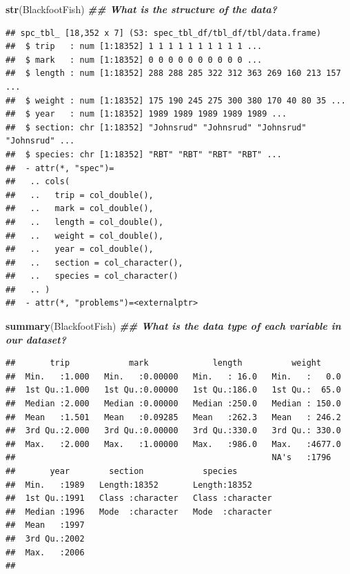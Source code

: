 \documentclass[
  10pt,
  letterpaper,
  twoside,
  openright]{book}
\newenvironment{Shaded}{\begin{snugshade}}{\end{snugshade}}
\newcommand{\DocumentationTok}[1]{\textcolor[rgb]{0.56,0.35,0.01}{\textbf{\textit{#1}}}}
\newcommand{\FunctionTok}[1]{\textcolor[rgb]{0.13,0.29,0.53}{\textbf{#1}}}
\newcommand{\NormalTok}[1]{#1}
\begin{document}
\begin{Shaded}
\begin{Highlighting}[]
\FunctionTok{str}\NormalTok{(BlackfootFish) }\DocumentationTok{\#\# What is the structure of the data?}
\end{Highlighting}
\end{Shaded}

\begin{verbatim}
## spc_tbl_ [18,352 x 7] (S3: spec_tbl_df/tbl_df/tbl/data.frame)
##  $ trip   : num [1:18352] 1 1 1 1 1 1 1 1 1 1 ...
##  $ mark   : num [1:18352] 0 0 0 0 0 0 0 0 0 0 ...
##  $ length : num [1:18352] 288 288 285 322 312 363 269 160 213 157 ...
##  $ weight : num [1:18352] 175 190 245 275 300 380 170 40 80 35 ...
##  $ year   : num [1:18352] 1989 1989 1989 1989 1989 ...
##  $ section: chr [1:18352] "Johnsrud" "Johnsrud" "Johnsrud" "Johnsrud" ...
##  $ species: chr [1:18352] "RBT" "RBT" "RBT" "RBT" ...
##  - attr(*, "spec")=
##   .. cols(
##   ..   trip = col_double(),
##   ..   mark = col_double(),
##   ..   length = col_double(),
##   ..   weight = col_double(),
##   ..   year = col_double(),
##   ..   section = col_character(),
##   ..   species = col_character()
##   .. )
##  - attr(*, "problems")=<externalptr>
\end{verbatim}

\begin{Shaded}
\begin{Highlighting}[]
\FunctionTok{summary}\NormalTok{(BlackfootFish) }\DocumentationTok{\#\# What is the data type of each variable in our dataset?}
\end{Highlighting}
\end{Shaded}

\begin{verbatim}
##       trip            mark             length          weight      
##  Min.   :1.000   Min.   :0.00000   Min.   : 16.0   Min.   :   0.0  
##  1st Qu.:1.000   1st Qu.:0.00000   1st Qu.:186.0   1st Qu.:  65.0  
##  Median :2.000   Median :0.00000   Median :250.0   Median : 150.0  
##  Mean   :1.501   Mean   :0.09285   Mean   :262.3   Mean   : 246.2  
##  3rd Qu.:2.000   3rd Qu.:0.00000   3rd Qu.:330.0   3rd Qu.: 330.0  
##  Max.   :2.000   Max.   :1.00000   Max.   :986.0   Max.   :4677.0  
##                                                    NA's   :1796    
##       year        section            species         
##  Min.   :1989   Length:18352       Length:18352      
##  1st Qu.:1991   Class :character   Class :character  
##  Median :1996   Mode  :character   Mode  :character  
##  Mean   :1997                                        
##  3rd Qu.:2002                                        
##  Max.   :2006                                        
## 
\end{verbatim}
\end{document}
